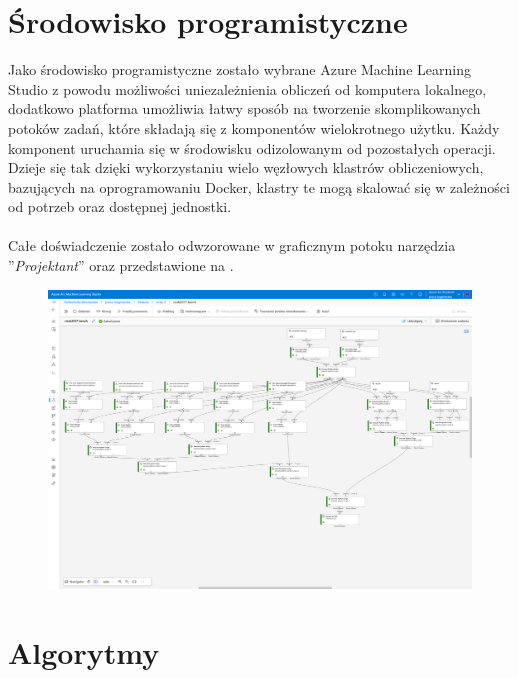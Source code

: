 \section{Środowisko programistyczne}
Jako środowisko programistyczne zostało wybrane Azure Machine Learning Studio z powodu możliwości uniezależnienia obliczeń od komputera lokalnego, dodatkowo platforma umożliwia łatwy sposób na tworzenie skomplikowanych potoków zadań, które składają się z komponentów wielokrotnego użytku. Każdy komponent uruchamia się w środowisku odizolowanym od pozostałych operacji. Dzieje się tak dzięki wykorzystaniu wielo węzłowych klastrów obliczeniowych, bazujących na oprogramowaniu Docker, klastry te mogą skalować się w zależności od potrzeb oraz dostępnej jednostki\cite{MicrosoftLearn2023}.
\\ \\
Całe doświadczenie zostało odwzorowane w graficznym potoku narzędzia ''\textit{Projektant}'' oraz przedstawione na .
\begin{landscape}
\begin{figure}[H]
    \centering
    \includegraphics[height=0.95\textwidth]{images/pipeline}
    \label{fig:pipeline}
\end{figure}
\end{landscape}

\section{Algorytmy}

